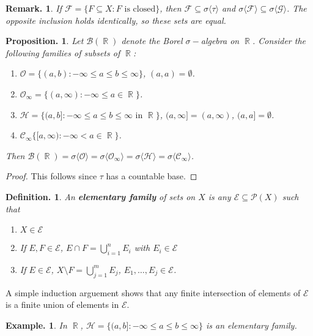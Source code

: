 \documentclass[11pt, a4paper]{memoir}
\DeclareMathOperator{\R}{{\mathbb{R}}}
\theoremstyle{change}
\newtheorem{proposition}[theorem]{Proposition.}
\theoremstyle{plain}
\theoremstyle{nonumberplain}
\newtheorem{definition}{Definition.}
\newtheorem{example}{Example.}
\newtheorem{remark}{Remark.}
\newtheorem{proof}{Proof}
\numberwithin{equation}{section}
\begin{document}
\begin{remark}
    If $\mathcal{F}=\{F\subseteq X:F\text{ is closed}\}$, then $\mathcal{F}\subseteq\sigma\langle\tau\rangle$ and $\sigma\langle\mathcal{F}\rangle\subseteq\sigma\langle\mathcal{G}\rangle$.
    The opposite inclusion holds identically, so these sets are equal.
\end{remark}
\begin{proposition}\label{prop:br-gen}
    Let $\mathcal{B}(\R)$ denote the Borel $\sigma-$algebra on $\R$.
    Consider the following families of subsets of $\R$:
    \begin{enumerate}[nolistsep]
        \item $\mathcal{O}=\{(a,b):-\infty\leq a\leq b\leq\infty\}$, $(a,a)=\emptyset$.
        \item $\mathcal{O}_\infty=\{(a,\infty):-\infty\leq a\in\R\}$.
        \item $\mathcal{H}=\{(a,b]:-\infty\leq a\leq b\leq\infty\text{ in }\R\}$, $(a,\infty]=(a,\infty)$, $(a,a]=\emptyset$.
        \item $\mathcal{C}_\infty\{[a,\infty):-\infty<a\in\R\}$.
    \end{enumerate}
    Then $\mathcal{B}(\R)=\sigma\langle\mathcal{O}\rangle=\sigma\langle\mathcal{O}_\infty\rangle=\sigma\langle\mathcal{H}\rangle=\sigma\langle\mathcal{C}_\infty\rangle$.
\end{proposition}
\begin{proof}
    This follows since $\tau$ has a countable base.
\end{proof}
\begin{definition}
    An \textbf{elementary family} of sets on $X$ is any $\mathcal{E}\subseteq\mathcal{P}(X)$ such that
    \begin{enumerate}[nolistsep,label=(\roman*)]
        \item $X\in\mathcal{E}$
        \item If $E,F\in\mathcal{E}$, $E\cap F=\bigcup_{i=1}^n E_i$ with $E_i\in\mathcal{E}$
        \item If $E\in\mathcal{E}$, $X\setminus F=\bigcup_{j=1}^m E_j$, $E_1,\ldots,E_j\in\mathcal{E}$.
    \end{enumerate}
\end{definition}
A simple induction arguement shows that any finite intersection of elements of $\mathcal{E}$ is a finite union of elements in $\mathcal{E}$.
\begin{example}
    In $\R$, $\mathcal{H}=\{(a,b]:-\infty\leq a\leq b\leq\infty\}$ is an elementary family.
\end{example}
\end{document}
